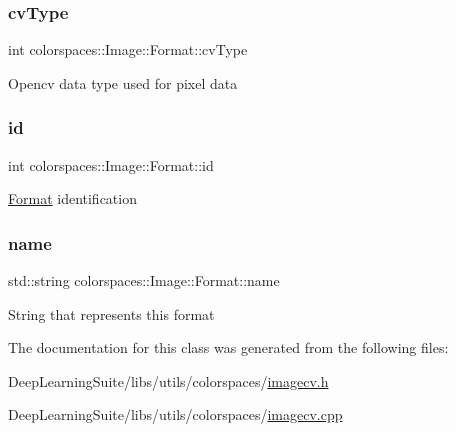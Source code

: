 \subsubsection{\texorpdfstring{cv\+Type}{cvType}}
{\footnotesize\ttfamily int colorspaces\+::\+Image\+::\+Format\+::cv\+Type}

Opencv data type used for pixel data \mbox{\label{classcolorspaces_1_1_image_1_1_format_af1ffb2ff3d465a7bcd608f35c01d11de}} 
\subsubsection{\texorpdfstring{id}{id}}
{\footnotesize\ttfamily int colorspaces\+::\+Image\+::\+Format\+::id}

\hyperlink{classcolorspaces_1_1_image_1_1_format}{Format} identification \mbox{\label{classcolorspaces_1_1_image_1_1_format_a0b2fef0398d48a881a56d38e04ad94b8}} 
\subsubsection{\texorpdfstring{name}{name}}
{\footnotesize\ttfamily std\+::string colorspaces\+::\+Image\+::\+Format\+::name}

String that represents this format 

The documentation for this class was generated from the following files\+:\begin{DoxyCompactItemize}
\item 
Deep\+Learning\+Suite/libs/utils/colorspaces/\hyperlink{imagecv_8h}{imagecv.\+h}\item 
Deep\+Learning\+Suite/libs/utils/colorspaces/\hyperlink{imagecv_8cpp}{imagecv.\+cpp}\end{DoxyCompactItemize}
